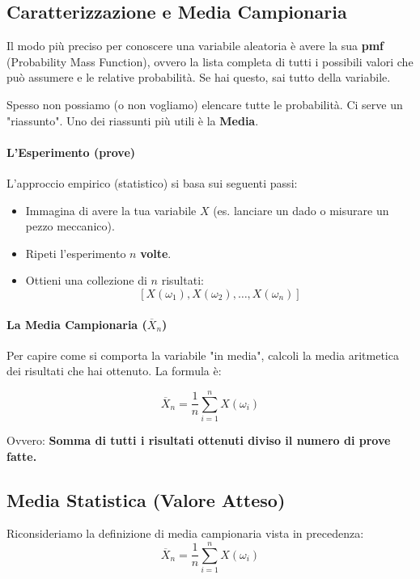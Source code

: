 \subsection{Caratterizzazione e Media Campionaria}

Il modo più preciso per conoscere una variabile aleatoria è avere la sua \textbf{pmf} (Probability Mass Function), ovvero la lista completa di tutti i possibili valori che può assumere e le relative probabilità. Se hai questo, sai tutto della variabile.

Spesso non possiamo (o non vogliamo) elencare tutte le probabilità. Ci serve un "riassunto". Uno dei riassunti più utili è la \textbf{Media}.

\paragraph{L'Esperimento (prove)}
L'approccio empirico (statistico) si basa sui seguenti passi:
\begin{itemize}
    \item Immagina di avere la tua variabile $X$ (es. lanciare un dado o misurare un pezzo meccanico).
    \item Ripeti l'esperimento $n$ \textbf{volte}.
    \item Ottieni una collezione di $n$ risultati:
    \[ [X(\omega_1), X(\omega_2), \dots, X(\omega_n)] \]
\end{itemize}

\paragraph{La Media Campionaria ($\overline{X}_n$)}
Per capire come si comporta la variabile "in media", calcoli la media aritmetica dei risultati che hai ottenuto. La formula è:

\begin{equation}
\boxed{\overline{X}_n = \frac{1}{n} \sum_{i=1}^n X(\omega_i)}
\end{equation}

Ovvero: \textbf{Somma di tutti i risultati ottenuti diviso il numero di prove fatte.}\

\subsection{Media Statistica (Valore Atteso)}

Riconsideriamo la definizione di media campionaria vista in precedenza:
\[
\overline{X}_n = \frac{1}{n} \sum_{i=1}^n X(\omega_i)
\]

